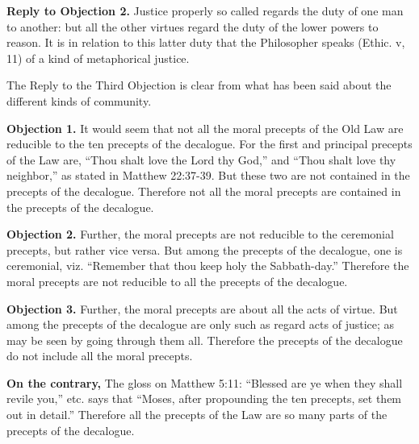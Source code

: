 \textbf{Reply to Objection 2.} Justice properly so called regards the duty of one man to another: but all the other virtues regard the duty of the lower powers to reason. It is in relation to this latter duty that the Philosopher speaks (Ethic. v, 11) of a kind of metaphorical justice.

The Reply to the Third Objection is clear from what has been said about the different kinds of community.


\textbf{Objection 1.} It would seem that not all the moral precepts of the Old Law are reducible to the ten precepts of the decalogue. For the first and principal precepts of the Law are, ``Thou shalt love the Lord thy God,'' and ``Thou shalt love thy neighbor,'' as stated in Matthew 22:37-39. But these two are not contained in the precepts of the decalogue. Therefore not all the moral precepts are contained in the precepts of the decalogue.

\textbf{Objection 2.} Further, the moral precepts are not reducible to the ceremonial precepts, but rather vice versa. But among the precepts of the decalogue, one is ceremonial, viz. ``Remember that thou keep holy the Sabbath-day.'' Therefore the moral precepts are not reducible to all the precepts of the decalogue.

\textbf{Objection 3.} Further, the moral precepts are about all the acts of virtue. But among the precepts of the decalogue are only such as regard acts of justice; as may be seen by going through them all. Therefore the precepts of the decalogue do not include all the moral precepts.

\textbf{On the contrary,} The gloss on Matthew 5:11: ``Blessed are ye when they shall revile you,'' etc. says that ``Moses, after propounding the ten precepts, set them out in detail.'' Therefore all the precepts of the Law are so many parts of the precepts of the decalogue.


